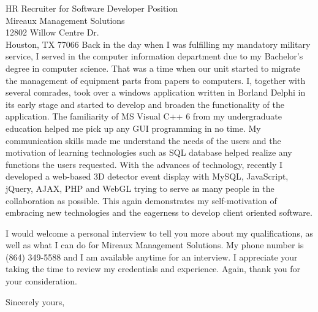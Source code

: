\documentclass{letter} %
\begin{document}
\begin{letter}{HR Recruiter for Software Developer Position \\
Mireaux Management Solutions \\
12802 Willow Centre Dr. \\
Houston, TX 77066}
\noindent %
Back in the day when I was fulfilling my mandatory military service, I served in the computer information department due to my Bachelor's degree in computer science. That was a time when our unit started to migrate the management of equipment parts from papers to computers. I, together with several comrades, took over a windows application written in Borland Delphi in its early stage and started to develop and broaden the functionality of the application. The familiarity of MS Visual C++ 6 from my undergraduate education helped me pick up any GUI programming in no time. My communication skills made me understand the needs of the users and the motivation of learning technologies such as SQL database helped realize any functions the users requested. With the advances of technology, recently I developed a web-based 3D detector event display with MySQL, JavaScript, jQuery, AJAX, PHP and WebGL trying to serve as many people in the collaboration as possible. This again demonstrates my self-motivation of embracing new technologies and the eagerness to develop client oriented software.
 
\noindent %
I would welcome a personal interview to tell you more about my qualifications, as well as what I can do for Mireaux Management Solutions. My phone number is (864) 349-5588 and I am available anytime for an interview. I appreciate your taking the time to review my credentials and experience. Again, thank you for your consideration. 
 
\closing{Sincerely yours,} 
 

 

\end{letter}
 
\end{document}

